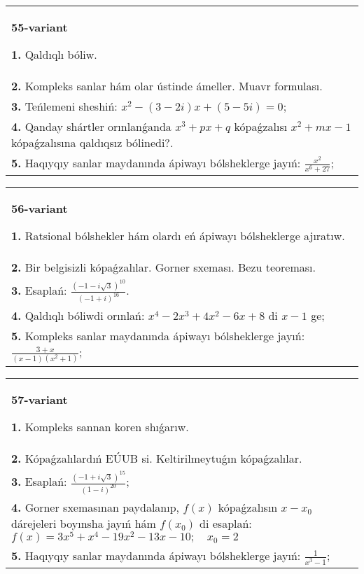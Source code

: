\documentclass{article}
\begin{document}
\begin{tabular}{m{17cm}}
\textbf{55-variant}
\newline

\textbf{1.} Qaldıqlı bóliw.  \\
\textbf{2.} Kompleks sanlar hám olar ústinde ámeller. Muavr formulası.  \\
\textbf{3.} Teńlemeni sheshiń:  $x^2-(3-2 i) x+(5-5 i)=0$; \\
\textbf{4.} Qanday shártler orınlanǵanda $x^3+p x+q$ kópaǵzalısı $x^2+m x-1$ kópaǵzalısına qaldıqsız bólinedi?. \\
\textbf{5.} Haqıyqıy sanlar maydanında ápiwayı bólsheklerge jayıń:  $\frac{x^2}{x^6+27}$; \\

\end{tabular}
\vspace{1cm}


\begin{tabular}{m{17cm}}
\textbf{56-variant}
\newline

\textbf{1.} Ratsional bólshekler hám olardı eń ápiwayı bólsheklerge ajıratıw. \\
\textbf{2.} Bir belgisizli kópaǵzalılar. Gorner sxeması. Bezu teoreması.  \\
\textbf{3.} Esaplań:  $\frac{(-1-i \sqrt{3})^{10}}{(-1+i)^{16}}$. \\
\textbf{4.} Qaldıqlı bóliwdi orınlań: $x^4-2 x^3+4 x^2-6 x+8$ di $x-1$ ge; \\
\textbf{5.} Kompleks sanlar maydanında ápiwayı bólsheklerge jayıń: $\frac{3+x}{(x-1)\left(x^2+1\right)}$; \\

\end{tabular}
\vspace{1cm}


\begin{tabular}{m{17cm}}
\textbf{57-variant}
\newline

\textbf{1.} Kompleks sannan koren shıǵarıw. \\
\textbf{2.} Kópaǵzalılardıń EÚUB si. Keltirilmeytuǵın   kópaǵzalılar. \\
\textbf{3.} Esaplań:  $\frac{(-1+i \sqrt{3})^{15}}{(1-i)^{20}}$; \\
\textbf{4.} Gorner sxemasınan paydalanıp, $f(x)$ kópaǵzalısın $x-x_0$ dárejeleri boyınsha jayıń hám $f\left(x_0\right)$ di esaplań: $f(x)=3 x^5+x^4-19 x^2-13 x-10 ; \quad x_0=2$ \\
\textbf{5.} Haqıyqıy sanlar maydanında ápiwayı bólsheklerge jayıń:  $\frac{1}{x^3-1}$; \\

\end{tabular}
\vspace{1cm}
\end{document}
